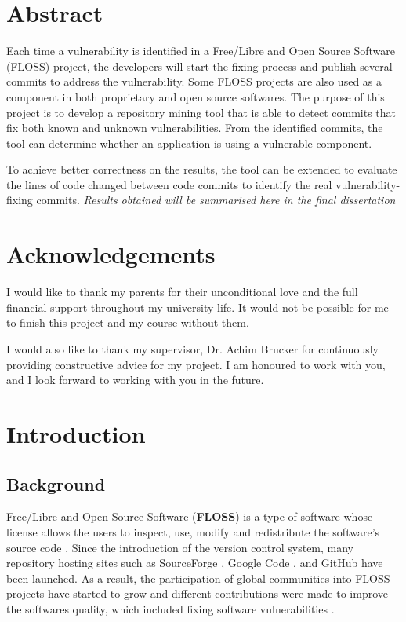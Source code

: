 \documentclass[12pt, a4paper]{report}
\begin{document}
\newpage

\chapter*{Abstract}
Each time a vulnerability is identified in a Free/Libre and Open Source Software (FLOSS) project,
the developers will start the fixing process and publish several commits to address the
vulnerability. Some FLOSS projects are also used as a component in both proprietary and open source
softwares. The purpose of this project is to develop a repository mining tool that is able to detect
commits that fix both known and unknown vulnerabilities. From the identified commits, the tool can
determine whether an application is using a vulnerable component.

To achieve better correctness on the results, the tool can be extended to evaluate the lines of code
changed between code commits to identify the real vulnerability-fixing commits. \textit{Results
obtained will be summarised here in the final dissertation}

\chapter*{Acknowledgements}
I would like to thank my parents for their unconditional love and the full financial support
throughout my university life. It would not be possible for me to finish this project and my course
without them.

I would also like to thank my supervisor, Dr. Achim Brucker for continuously providing constructive
advice for my project. I am honoured to work with you, and I look forward to working with you in the
future.

\newpage

\tableofcontents


\listoftables

\newpage


\chapter{Introduction}
\section{Background}
Free/Libre and Open Source Software (\textbf{FLOSS}) is a type of software whose license allows the
users to inspect, use, modify and redistribute the software's source code \cite{crowston_2012}.
Since the introduction of the version control system, many repository hosting sites such as
SourceForge \cite{sourceforge}, Google Code \cite{google_code}, and GitHub \cite{github} have been
launched. As a result, the participation of global communities into FLOSS projects have started to
grow and different contributions were made to improve the softwares quality, which included fixing
software vulnerabilities \cite{dabbish_2012}.
\end{document}

